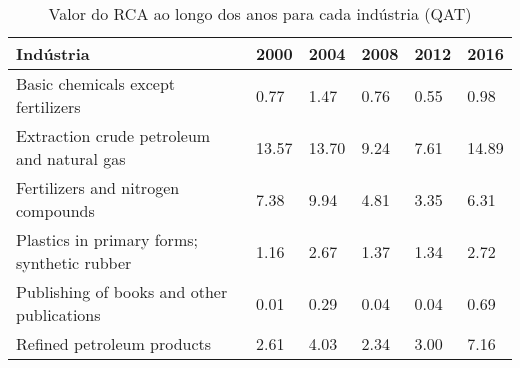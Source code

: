 \begin{table}
\centering
\caption{Valor do RCA ao longo dos anos para cada indústria (QAT)}
\label{tab:ex3-tempo-QAT}
\begin{tabular}{p{6cm}p{1.5cm}p{1.5cm}p{1.5cm}p{1.5cm}p{1.5cm}}
\toprule
                                  Indústria &  2000 &  2004 & 2008 & 2012 &  2016 \\
\midrule
         Basic chemicals except fertilizers &  0.77 &  1.47 & 0.76 & 0.55 &  0.98 \\
 Extraction crude petroleum and natural gas & 13.57 & 13.70 & 9.24 & 7.61 & 14.89 \\
         Fertilizers and nitrogen compounds &  7.38 &  9.94 & 4.81 & 3.35 &  6.31 \\
Plastics in primary forms; synthetic rubber &  1.16 &  2.67 & 1.37 & 1.34 &  2.72 \\
 Publishing of books and other publications &  0.01 &  0.29 & 0.04 & 0.04 &  0.69 \\
                 Refined petroleum products &  2.61 &  4.03 & 2.34 & 3.00 &  7.16 \\
\bottomrule
\end{tabular}
\end{table}
